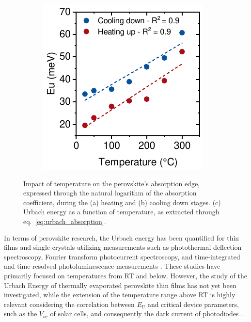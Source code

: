 \begin{figure}[htbp]
\begin{subfigure}{0.32\textwidth}
        \caption{}
        \label{fig:ellipsometry:urbach_cooling}
    \end{subfigure}
    \hfill
    \begin{subfigure}{0.3\textwidth}
        \includegraphics[width=\textwidth]{chapters/ellipsometry/image/Urbach_temp.pdf}
        \caption{}
        \label{fig:ellipsometry:urbach_temp}
    \end{subfigure}
    \caption{Impact of temperature on the perovskite's absorption edge, expressed through the natural logarithm of the absorption coefficient, during the (a) heating and (b) cooling down stages. (c) Urbach energy as a function of temperature, as extracted through eq.~\ref{eq:urbach_absorption}. }
    \label{fig:ellipsometry:urbach}
\end{figure}

In terms of perovskite research, the Urbach energy has been quantified for thin films and single crystals utilizing measurements such as photothermal deflection spectroscopy, Fourier transform photocurrent spectroscopy, and time-integrated and time-resolved photoluminescence measurements \cite{Zhang2022UnravelingDisorder, Ledinsky2019TemperaturePerovskites, Singh2016EffectCH3NH3PbI3, DeWolf2014OrganometallicPerformance, Falsini2022AnalysisPerovskites}. These studies have primarily focused on temperatures from RT and below. However, the study of the Urbach Energy of thermally evaporated perovskite thin films has not yet been investigated, while the extension of the temperature range above RT is highly relevant considering the correlation between $E_U$ and critical device parameters, such as the $V_{oc}$ of solar cells, and consequently the dark current of photodiodes \cite{Ledinsky2019TemperaturePerovskites}.

